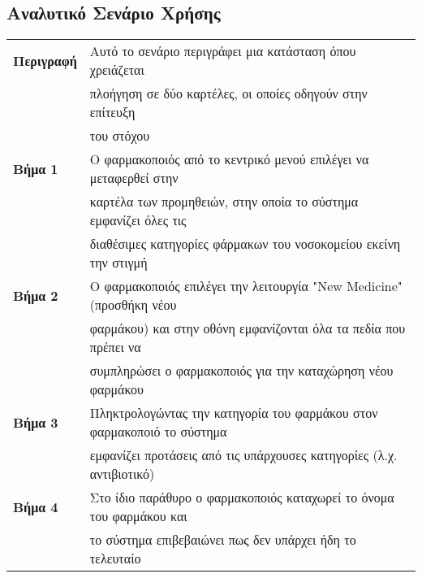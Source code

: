 \documentclass{article}
\newcommand\T{\rule{0pt}{2.6ex}}       %
\newcommand\B{\rule[-1.2ex]{0pt}{0pt}}
\begin{document}
   \subsection{Αναλυτικό Σενάριο Χρήσης}
   
\begin{center}
    \begin{tabular}{|l|l|}
    \hline
      \textbf{Περιγραφή} & Αυτό το σενάριο περιγράφει μια κατάσταση όπου χρειάζεται \T \\& πλοήγηση σε δύο καρτέλες, οι οποίες οδηγούν στην επίτευξη \\& του στόχου \B \\ 
      \hline
      \textbf{Βήμα 1} & Ο φαρμακοποιός από το κεντρικό μενού επιλέγει να μεταφερθεί στην \T \\& καρτέλα των προμηθειών, στην οποία το σύστημα εμφανίζει όλες τις \\& διαθέσιμες κατηγορίες φάρμακων του νοσοκομείου εκείνη την στιγμή\B \\
      \hline
      \textbf{Βήμα 2} & Ο φαρμακοποιός επιλέγει την λειτουργία "New Medicine" (προσθήκη νέου \T \\& φαρμάκου) και στην οθόνη εμφανίζονται όλα τα πεδία που πρέπει να \\& συμπληρώσει  ο φαρμακοποιός για την καταχώρηση νέου φαρμάκου \B \\
      \hline
      \textbf{Βήμα 3} & Πληκτρολογώντας την κατηγορία του φαρμάκου στον φαρμακοποιό το σύστημα \T \\& εμφανίζει  προτάσεις από τις υπάρχουσες κατηγορίες  (λ.χ. αντιβιοτικό) \B \\
      \hline
      \textbf{Βήμα 4} & Στο ίδιο παράθυρο ο φαρμακοποιός καταχωρεί το όνομα του φαρμάκου και \T \\& το σύστημα επιβεβαιώνει πως δεν υπάρχει ήδη το τελευταίο \B \\
      \hline
    \end{tabular}
\end{center}

\newpage
 
\end{document}
